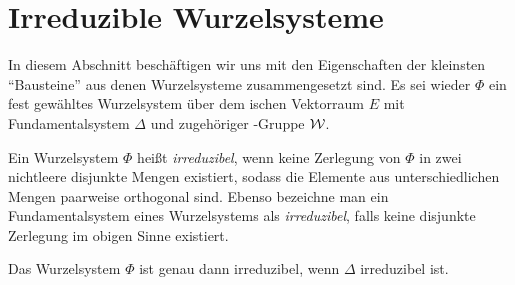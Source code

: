 \section{Irreduzible Wurzelsysteme}
\label{sec:irreduc}

In diesem Abschnitt beschäftigen wir uns mit den Eigenschaften der kleinsten ``Bausteine'' aus denen Wurzelsysteme zusammengesetzt sind.
Es sei wieder $\Phi$ ein fest gewähltes Wurzelsystem über dem \euklid ischen Vektorraum $E$ mit Fundamentalsystem $\Delta$ und zugehöriger \weyl\hyp{}Gruppe $\mathcal{W}$.

\begin{defn}
  Ein Wurzelsystem $\Phi$ heißt \emph{irreduzibel}, wenn keine Zerlegung von $\Phi$ in zwei nichtleere disjunkte Mengen existiert, sodass die Elemente aus unterschiedlichen Mengen paarweise orthogonal sind.
  Ebenso bezeichne man ein Fundamentalsystem eines Wurzelsystems als \emph{irreduzibel}, falls keine disjunkte Zerlegung im obigen Sinne existiert.
\end{defn}

\begin{lem}
  \label{lem:irreducibleRoot}
  Das Wurzelsystem $\Phi$ ist genau dann irreduzibel, wenn $\Delta$ irreduzibel ist.
\end{lem}

